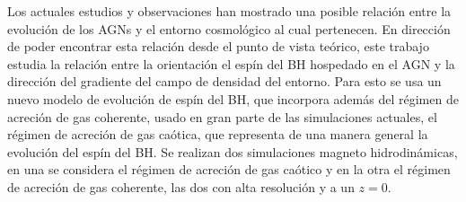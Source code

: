 

\begin{abstracts}






Los actuales estudios y observaciones han mostrado una posible relación entre la evolución de los AGNs y el entorno cosmológico al cual pertenecen. En dirección de poder encontrar esta relación desde el punto de vista teórico, este trabajo estudia la relación entre la orientación el espín del BH  hospedado en el AGN y la dirección del gradiente del campo de densidad del entorno. Para esto se usa un nuevo modelo de evolución de espín del BH, que incorpora además del régimen de acreción de gas coherente, usado en gran parte de las simulaciones actuales, el régimen de acreción de gas caótica, que representa de una manera general la evolución del espín del BH. Se realizan dos simulaciones magneto hidrodinámicas, en una se considera el régimen de acreción de gas caótico y en la otra el régimen de acreción de gas coherente, las dos con alta resolución y a un  $z=0$. 


\end{abstracts}

